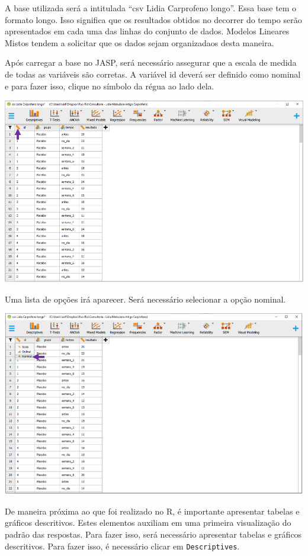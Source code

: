 \documentclass[
]{book}
\begin{document}
A base utilizada será a intitulada ``csv Lidia Carprofeno longo''. Essa base tem o formato longo. Isso significa que os resultados obtidos no decorrer do tempo serão apresentados em cada uma das linhas do conjunto de dados. Modelos Lineares Mistos tendem a solicitar que os dados sejam organizadaos desta maneira.

Após carregar a base no JASP, será necessário assegurar que a escala de medida de todas as variáveis são corretas. A variável id deverá ser definido como nominal e para fazer isso, clique no símbolo da régua ao lado dela.

\includegraphics{./img/cap_lmm_nivel_medida.png}

Uma lista de opções irá aparecer. Será necessário selecionar a opção nominal.

\includegraphics{./img/cap_lmm_nivel_medida2.png}

De maneira próxima ao que foi realizado no R, é importante apresentar tabelas e gráficos descritivos. Estes elementos auxiliam em uma primeira visualização do padrão das respostas. Para fazer isso, será necessário apresentar tabelas e gráficos descritivos. Para fazer isso, é necessário clicar em \texttt{Descriptives}.
\end{document}
